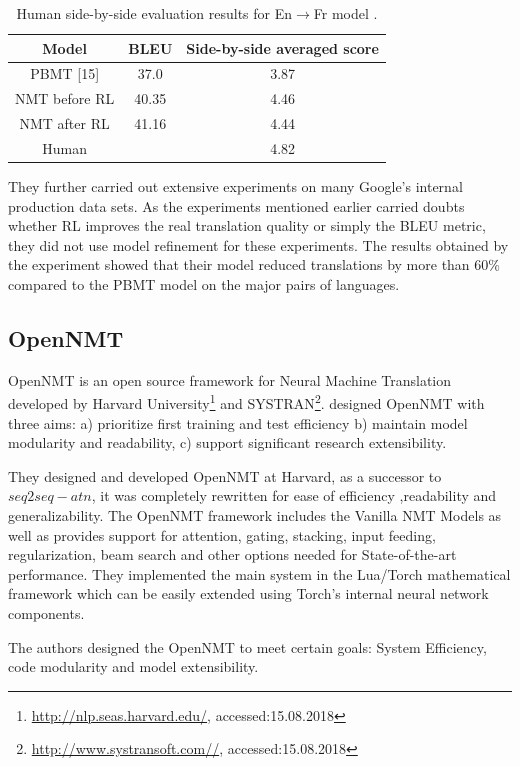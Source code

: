 \begin{table}[h!]
\centering
 \begin{tabular}{ |ccc| } 
  \hline Model &  BLEU & Side-by-side
averaged score \\ 
  \hline PBMT [15]  &   37.0 & 3.87\\
  NMT before RL& 40.35&4.46\\
  NMT after RL&41.16& 4.44\\
  \hline
  Human &   &  4.82\\
  \hline
 \end{tabular}
\caption{Human side-by-side evaluation results for En$\rightarrow$Fr model \citep{45610}.}
\label{humantable}
\end{table}
They further carried out extensive experiments on many Google’s internal production data sets. As the experiments mentioned earlier carried doubts whether RL improves the real translation quality or simply the BLEU metric, they did not use model refinement for these experiments. The results obtained by the experiment showed that their model reduced translations by more than 60\% compared to the PBMT model on the major pairs of languages.


\subsection{OpenNMT}
OpenNMT is an open source framework for Neural Machine Translation developed by Harvard University\footnote{\url{http://nlp.seas.harvard.edu/}, accessed:15.08.2018} and SYSTRAN\footnote{\url{http://www.systransoft.com//}, accessed:15.08.2018}. \cite{opennmt} designed OpenNMT with three aims: a) prioritize first training and test efficiency b) maintain model modularity and readability, c) support significant research extensibility. 

They designed and developed  OpenNMT at Harvard, as a successor to $seq2seq-atn$, it was completely rewritten for ease of efficiency ,readability and generalizability. The OpenNMT framework includes the Vanilla NMT Models as well as provides support for attention, gating, stacking, input feeding, regularization, beam search and other options needed for State-of-the-art performance. They implemented the main system in the Lua/Torch mathematical framework which can be easily extended using Torch's internal neural network components. 

The authors designed the OpenNMT to meet certain goals: System Efficiency, code modularity and model extensibility. 

